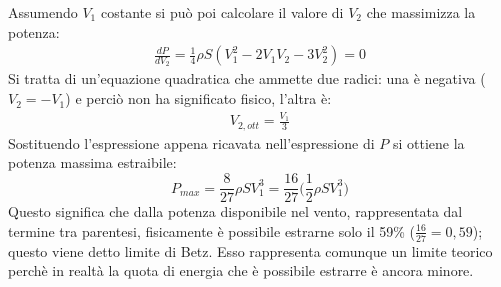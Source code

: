 Assumendo $V_1$ costante si può poi calcolare il valore di $V_2$ che massimizza la potenza:
\begin{align*}
\frac{dP}{dV_2} = \frac{1}{4} \rho S \left( V_1^2 - 2 V_1 V_2 - 3 V_2^2 \right) = 0
\end{align*}
Si tratta di un'equazione quadratica che ammette due radici: una è negativa ($V_2=-V_1 $) e perciò non ha significato fisico, l'altra è:
\begin{align*}
V_{2,ott} = \frac{V_1}{3}
\end{align*}
Sostituendo l'espressione appena ricavata nell'espressione di $P$ si ottiene la potenza massima estraibile:
\begin{equation}
\boxed{P_{max} = \frac{8}{27} \rho S V_1^3 = \frac{16}{27} \bigg(\frac{1}{2} \rho S V_1^3\bigg)}
\end{equation}
Questo significa che dalla potenza disponibile nel vento, rappresentata dal termine tra parentesi, fisicamente è possibile estrarne solo il 59\% ($\frac{16}{27}=0,59$); questo viene detto limite di Betz. Esso rappresenta comunque un limite teorico perchè in realtà la quota di energia che è possibile estrarre è ancora minore.

